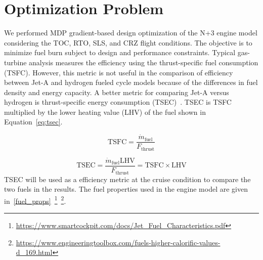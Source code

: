 \documentclass[conf]{new-aiaa}
\begin{document}
\section{Optimization Problem}
\label{sec:optprob}
We performed MDP gradient-based design optimization of the N+3 engine model considering the TOC, RTO, SLS, and CRZ flight conditions.
The objective is to minimize fuel burn subject to design and performance constraints.
Typical gas-turbine analysis measures the efficiency using the thrust-specific fuel consumption (TSFC).
However, this metric is not useful in the comparison of efficiency between Jet-A and hydrogen fueled cycle models because of the differences in fuel density and energy capacity.
A better metric for comparing Jet-A versus hydrogen is thrust-specific energy consumption (TSEC)~\cite{Adler2023}.
TSEC is TSFC multiplied by the lower heating value (LHV) of the fuel shown in Equation~\eqref{eq:tsec}.

\begin{equation}
    \mathrm{TSFC} = \frac{\dot{m}_{\mathrm{fuel}}}{F_{\mathrm{thrust}}}
    \label{eq:tsfc}
\end{equation}

\begin{equation}
    \mathrm{TSEC} = \frac{\dot{m}_{\mathrm{fuel}} \mathrm{LHV}}{F_{\mathrm{thrust}}} = \mathrm{TSFC} \times \mathrm{LHV}
    \label{eq:tsec}
\end{equation}
TSEC will be used as a efficiency metric at the cruise condition to compare the two fuels in the results.
The fuel properties used in the engine model are given in~\ref{fuel_props}~\footnote{\url{https://www.smartcockpit.com/docs/Jet_Fuel_Characteristics.pdf}}~\footnote{\url{https://www.engineeringtoolbox.com/fuels-higher-calorific-values-d_169.html}}.
\end{document}

